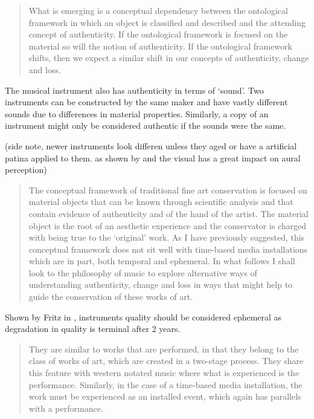\begin{quotation}
What is emerging is a conceptual dependency between the ontological framework in
which an object is classified and described and the attending concept of
authenticity. If the ontological framework is focused on the material so will
the notion of authenticity. If the ontological framework shifts, then we expect
a similar shift in our concepts of authenticity, change and loss.
\end{quotation}

The musical instrument also has authenticity in terms of `sound'. Two
instruments can be constructed by the same maker and have vastly different
sounds due to differences in material properties. Similarly, a copy of an
instrument might only be considered authentic if the sounds were the same.

(side note, newer instruments look differen unless they aged or have a
artificial patina applied to them. as shown by \cite{fritz_player_2012} and
\cite{tsay_sight_2013} the visual has a great impact on aural perception)

\begin{quotation}
The conceptual framework of traditional fine art conservation is focused on
material objects that can be known through scientific analysis and that contain
evidence of authenticity and of the hand of the artist. The material object is
the root of an aesthetic experience and the conservator is charged with being
true to the ‘original’ work. As I have previously suggested, this conceptual
framework does not sit well with time-based media installations which are in
part, both temporal and ephemeral. In what follows I shall look to the
philosophy of music to explore alternative ways of understanding authenticity,
change and loss in ways that might help to guide the conservation of these works
of art.
\end{quotation}

Shown by Fritz in \cite{fritz_listener_2017}, instruments quality should be
considered ephemeral as degradation in quality is terminal after 2 years.


\begin{quotation}
They are similar to works that are performed, in that they belong to the class
of works of art, which are created in a two-stage process. They share this
feature with western notated music where what is experienced is the performance.
Similarly, in the case of a time-based media installation, the work must be
experienced as an installed event, which again has parallels with a performance.
\end{quotation}

